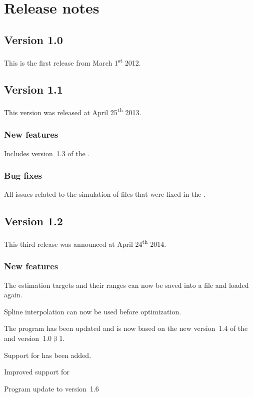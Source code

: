 \chapter{Release notes}

\section{Version 1.0}

This is the first release from March 1\textsuperscript{st} 2012.

\section{Version 1.1}

This version was released at April 25\textsuperscript{th} 2013.

\subsection{New features}
Includes version~1.3 of the \SBSCL \citep{Keller2013}.

\subsection{Bug fixes}
All issues related to the simulation of \SBML files that were fixed in the \SBSCL.


\section{Version 1.2}

This third release was announced at April 24\textsuperscript{th} 2014.

\subsection{New features}
\begin{dinglist}{52}
\item The estimation targets and their ranges can now be saved into a
      file and loaded again.
\item Spline interpolation can now be used before optimization.   
\item The program has been updated and is now based on the new version~1.4
      of the \SBSCL and \JSBML version~1.0$\upbeta$1.
\item Support for \Garuda has been added.   
\item Improved support for \MacOSX
\item Program update to \Java version~1.6
\end{dinglist}

